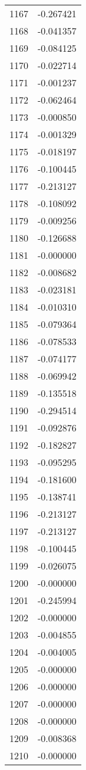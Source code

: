 \documentclass[12pt]{article}
\begin{document}
\begin{longtable}{@{}cc@{}}
1167 & -0.267421 \\
1168 & -0.041357 \\
1169 & -0.084125 \\
1170 & -0.022714 \\
1171 & -0.001237 \\
1172 & -0.062464 \\
1173 & -0.000850 \\
1174 & -0.001329 \\
1175 & -0.018197 \\
1176 & -0.100445 \\
1177 & -0.213127 \\
1178 & -0.108092 \\
1179 & -0.009256 \\
1180 & -0.126688 \\
1181 & -0.000000 \\
1182 & -0.008682 \\
1183 & -0.023181 \\
1184 & -0.010310 \\
1185 & -0.079364 \\
1186 & -0.078533 \\
1187 & -0.074177 \\
1188 & -0.069942 \\
1189 & -0.135518 \\
1190 & -0.294514 \\
1191 & -0.092876 \\
1192 & -0.182827 \\
1193 & -0.095295 \\
1194 & -0.181600 \\
1195 & -0.138741 \\
1196 & -0.213127 \\
1197 & -0.213127 \\
1198 & -0.100445 \\
1199 & -0.026075 \\
1200 & -0.000000 \\
1201 & -0.245994 \\
1202 & -0.000000 \\
1203 & -0.004855 \\
1204 & -0.004005 \\
1205 & -0.000000 \\
1206 & -0.000000 \\
1207 & -0.000000 \\
1208 & -0.000000 \\
1209 & -0.008368 \\
1210 & -0.000000 \\

\end{longtable}
\end{document}
